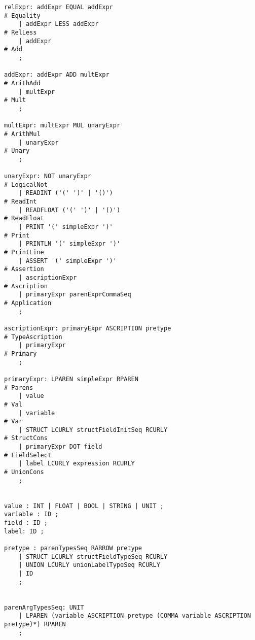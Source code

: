\begin{lstlisting}
relExpr: addExpr EQUAL addExpr                                            # Equality
    | addExpr LESS addExpr                                                # RelLess
    | addExpr                                                             # Add
    ;

addExpr: addExpr ADD multExpr                                             # ArithAdd
    | multExpr                                                            # Mult
    ;

multExpr: multExpr MUL unaryExpr                                          # ArithMul
    | unaryExpr                                                           # Unary
    ;

unaryExpr: NOT unaryExpr                                                  # LogicalNot
    | READINT ('(' ')' | '()')                                            # ReadInt
    | READFLOAT ('(' ')' | '()')                                          # ReadFloat
    | PRINT '(' simpleExpr ')'                                            # Print
    | PRINTLN '(' simpleExpr ')'                                          # PrintLine
    | ASSERT '(' simpleExpr ')'                                           # Assertion
    | ascriptionExpr                                                      # Ascription
    | primaryExpr parenExprCommaSeq                                       # Application
    ;

ascriptionExpr: primaryExpr ASCRIPTION pretype                            # TypeAscription
    | primaryExpr                                                         # Primary
    ;

primaryExpr: LPAREN simpleExpr RPAREN                                     # Parens
    | value                                                               # Val
    | variable                                                            # Var
    | STRUCT LCURLY structFieldInitSeq RCURLY                             # StructCons
    | primaryExpr DOT field                                               # FieldSelect
    | label LCURLY expression RCURLY                                      # UnionCons
    ;


value : INT | FLOAT | BOOL | STRING | UNIT ;
variable : ID ;
field : ID ;
label: ID ;

pretype : parenTypesSeq RARROW pretype
    | STRUCT LCURLY structFieldTypeSeq RCURLY
    | UNION LCURLY unionLabelTypeSeq RCURLY
    | ID
    ;


parenArgTypesSeq: UNIT
    | LPAREN (variable ASCRIPTION pretype (COMMA variable ASCRIPTION pretype)*) RPAREN
    ;


\end{lstlisting}
